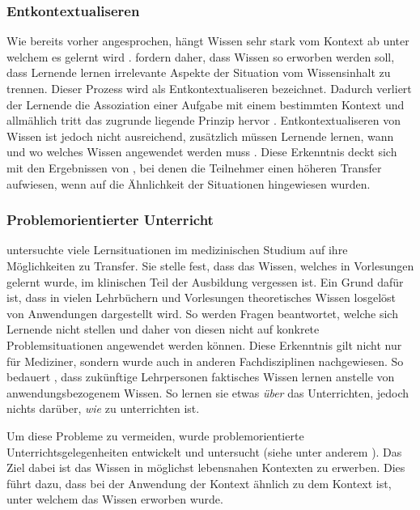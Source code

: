 \subsubsection{Entkontextualiseren}

Wie bereits vorher angesprochen, hängt Wissen sehr stark vom Kontext ab unter welchem es gelernt wird \citep{Godden1975,Schoenfeld1988}. \citet{Anderson1996} fordern daher, dass Wissen so erworben werden soll, dass Lernende lernen irrelevante Aspekte der Situation vom Wissensinhalt zu trennen. Dieser Prozess wird als Entkontextualiseren bezeichnet. Dadurch verliert der Lernende die Assoziation einer Aufgabe mit einem bestimmten Kontext und allmählich tritt das zugrunde liegende Prinzip hervor \citep{Perkins1989}. Entkontextualiseren von Wissen ist jedoch nicht ausreichend, zusätzlich müssen Lernende lernen, wann und wo welches Wissen angewendet werden muss \citep{Wiggins1993}. Diese Erkenntnis deckt sich mit den Ergebnissen von \citet{Gick1980}, bei denen die Teilnehmer einen höheren Transfer aufwiesen, wenn auf die Ähnlichkeit der Situationen hingewiesen wurden.


\subsubsection{Problemorientierter Unterricht}

\citet{Williams1992} untersuchte viele Lernsituationen im medizinischen Studium auf ihre Möglichkeiten zu Transfer. Sie stelle fest, dass das Wissen, welches in Vorlesungen gelernt wurde, im klinischen Teil der Ausbildung vergessen ist. Ein Grund dafür ist, dass in vielen Lehrbüchern und Vorlesungen theoretisches Wissen losgelöst von Anwendungen dargestellt wird. So werden Fragen beantwortet, welche sich Lernende nicht stellen und daher von diesen nicht auf konkrete Problemsituationen angewendet werden können.
Diese Erkenntnis gilt nicht nur für Mediziner, sondern wurde auch in anderen Fachdisziplinen nachgewiesen. So bedauert \citet{Shuell1996}, dass zukünftige Lehrpersonen faktisches Wissen lernen anstelle von anwendungsbezogenem Wissen. So lernen sie etwas \textit{über} das Unterrichten, jedoch nichts darüber, \textit{wie} zu unterrichten ist.

Um diese Probleme zu vermeiden, wurde problemorientierte Unterrichtsgelegenheiten entwickelt und untersucht (siehe unter anderem \citet{Barrows1985,Michael1993,Shuell1996,Corte2003,Reusser2005,Fassler2007,Pea2013b}). Das Ziel dabei ist das Wissen in möglichst lebensnahen Kontexten zu erwerben. Dies führt dazu, dass bei der Anwendung der Kontext ähnlich zu dem Kontext ist, unter welchem das Wissen erworben wurde.

